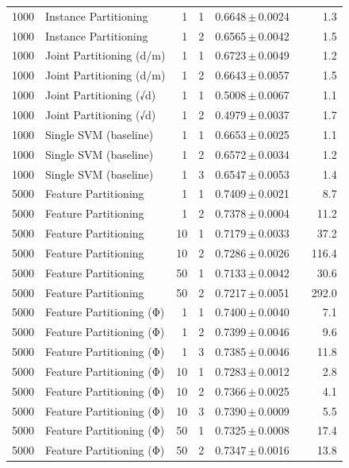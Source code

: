 \begin{table}[ht]
\begin{tabular}{rlrrccr}
1000 & Instance Partitioning & 1 & 1 & 0.6648\,$\pm$\,0.0024 &  & 1.3 \\
1000 & Instance Partitioning & 1 & 2 & 0.6565\,$\pm$\,0.0042 &  & 1.5 \\
1000 & Joint Partitioning (d/m) & 1 & 1 & 0.6723\,$\pm$\,0.0049 &  & 1.2 \\
1000 & Joint Partitioning (d/m) & 1 & 2 & 0.6643\,$\pm$\,0.0057 &  & 1.5 \\
1000 & Joint Partitioning (√d) & 1 & 1 & 0.5008\,$\pm$\,0.0067 &  & 1.1 \\
1000 & Joint Partitioning (√d) & 1 & 2 & 0.4979\,$\pm$\,0.0037 &  & 1.7 \\
1000 & Single SVM (baseline) & 1 & 1 & 0.6653\,$\pm$\,0.0025 &  & 1.1 \\
1000 & Single SVM (baseline) & 1 & 2 & 0.6572\,$\pm$\,0.0034 &  & 1.2 \\
1000 & Single SVM (baseline) & 1 & 3 & 0.6547\,$\pm$\,0.0053 &  & 1.4 \\
5000 & Feature Partitioning & 1 & 1 & 0.7409\,$\pm$\,0.0021 &  & 8.7 \\
5000 & Feature Partitioning & 1 & 2 & 0.7378\,$\pm$\,0.0004 &  & 11.2 \\
5000 & Feature Partitioning & 10 & 1 & 0.7179\,$\pm$\,0.0033 &  & 37.2 \\
5000 & Feature Partitioning & 10 & 2 & 0.7286\,$\pm$\,0.0026 &  & 116.4 \\
5000 & Feature Partitioning & 50 & 1 & 0.7133\,$\pm$\,0.0042 &  & 30.6 \\
5000 & Feature Partitioning & 50 & 2 & 0.7217\,$\pm$\,0.0051 &  & 292.0 \\
5000 & Feature Partitioning (Φ) & 1 & 1 & 0.7400\,$\pm$\,0.0040 &  & 7.1 \\
5000 & Feature Partitioning (Φ) & 1 & 2 & 0.7399\,$\pm$\,0.0046 &  & 9.6 \\
5000 & Feature Partitioning (Φ) & 1 & 3 & 0.7385\,$\pm$\,0.0046 &  & 11.8 \\
5000 & Feature Partitioning (Φ) & 10 & 1 & 0.7283\,$\pm$\,0.0012 &  & 2.8 \\
5000 & Feature Partitioning (Φ) & 10 & 2 & 0.7366\,$\pm$\,0.0025 &  & 4.1 \\
5000 & Feature Partitioning (Φ) & 10 & 3 & 0.7390\,$\pm$\,0.0009 &  & 5.5 \\
5000 & Feature Partitioning (Φ) & 50 & 1 & 0.7325\,$\pm$\,0.0008 &  & 17.4 \\
5000 & Feature Partitioning (Φ) & 50 & 2 & 0.7347\,$\pm$\,0.0016 &  & 13.8 \\

\end{tabular}
\end{table}
